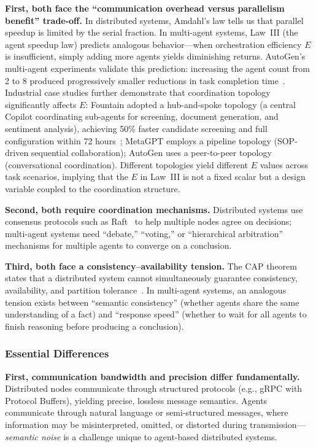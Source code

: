 \documentclass[11pt,a4paper]{article}
\begin{document}
\textbf{First, both face the ``communication overhead versus parallelism benefit'' trade-off.}
In distributed systems, Amdahl's law tells us that parallel speedup is limited by the serial fraction.
In multi-agent systems, Law~III (the agent speedup law) predicts analogous behavior---when orchestration efficiency $E$ is insufficient, simply adding more agents yields diminishing returns.
AutoGen's multi-agent experiments validate this prediction: increasing the agent count from 2 to 8 produced progressively smaller reductions in task completion time~\cite{wu2023autogen}.
Industrial case studies further demonstrate that coordination topology significantly affects $E$: Fountain adopted a hub-and-spoke topology (a central Copilot coordinating sub-agents for screening, document generation, and sentiment analysis), achieving 50\% faster candidate screening and full configuration within 72 hours~\cite{anthropic2026agenticreport}; MetaGPT employs a pipeline topology (SOP-driven sequential collaboration); AutoGen uses a peer-to-peer topology (conversational coordination).
Different topologies yield different $E$ values across task scenarios, implying that the $E$ in Law~III is not a fixed scalar but a design variable coupled to the coordination structure.

\textbf{Second, both require coordination mechanisms.}
Distributed systems use consensus protocols such as Raft~\cite{raft2014} to help multiple nodes agree on decisions; multi-agent systems need ``debate,'' ``voting,'' or ``hierarchical arbitration'' mechanisms for multiple agents to converge on a conclusion.

\textbf{Third, both face a consistency--availability tension.}
The CAP theorem states that a distributed system cannot simultaneously guarantee consistency, availability, and partition tolerance~\cite{cap2002}.
In multi-agent systems, an analogous tension exists between ``semantic consistency'' (whether agents share the same understanding of a fact) and ``response speed'' (whether to wait for all agents to finish reasoning before producing a conclusion).

\subsubsection{Essential Differences}

\textbf{First, communication bandwidth and precision differ fundamentally.}
Distributed nodes communicate through structured protocols (e.g., gRPC with Protocol Buffers), yielding precise, lossless message semantics.
Agents communicate through natural language or semi-structured messages, where information may be misinterpreted, omitted, or distorted during transmission---\textit{semantic noise} is a challenge unique to agent-based distributed systems.
\end{document}
